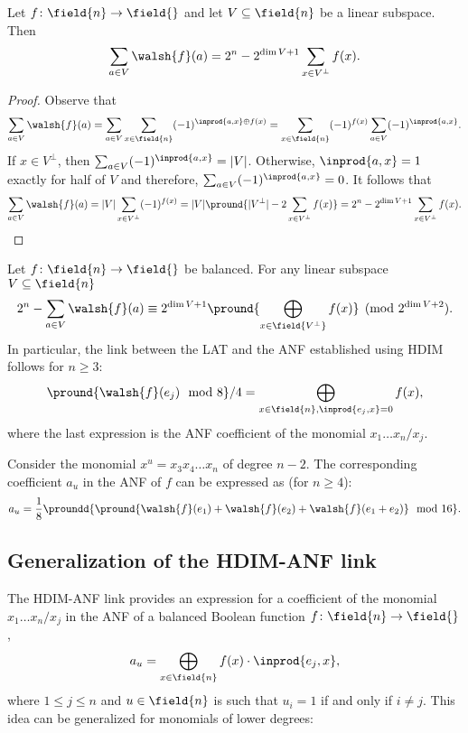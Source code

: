 \begin{theorem}
Let $f\colon \field{n} \to \field{}$ and let $V\subseteq \field{n}$ be a linear subspace. Then
$$
\sum_{a \in V}\walsh{f}(a) = 2^n-2^{\dim{V}+1}\sum_{x \in V^{\bot}}f(x).
$$
\end{theorem}
\begin{proof}
Observe that
$$
\sum_{a \in V}\walsh{f}(a) =
\sum_{a \in V}\sum_{x \in \field{n}}(-1)^{\inprod{a,x}\oplus f(x)} =
\sum_{x \in \field{n}}(-1)^{f(x)} \sum_{a \in V} (-1)^{\inprod{a,x}}.
$$
If $x \in V^{\bot}$, then $\sum_{a\in V}(-1)^{\inprod{a,x}}=|V|$. Otherwise, $\inprod{a,x}=1$ exactly for half of $V$ and therefore, $\sum_{a\in V}(-1)^{\inprod{a,x}}=0$. It follows that
$$
\sum_{a \in V}\walsh{f}(a) =
|V|\sum_{x \in V^{\bot}}(-1)^{f(x)} = 
|V|\pround{|V^{\bot}|-2\sum_{x \in V^{\bot}}f(x)} = 
2^n-2^{\dim{V}+1}\sum_{x \in V^{\bot}}f(x).
$$
\end{proof}

\begin{corollary}
Let $f\colon \field{n} \to \field{}$ be balanced. For any linear subspace $V \subseteq \field{n}$
$$
2^n - \sum_{a \in V}\walsh{f}(a)
\equiv
2^{\dim{V}+1} \pround{\bigoplus_{x\in \field{V^{\bot}}} f(x)} \pmod{{2^{\dim{V}+2}}}.
$$
In particular, the link between the LAT and the ANF established using HDIM follows for $n\ge 3$:
$$
\pround{\walsh{f}(e_j) \mod{8}}/4 = \bigoplus_{x \in \field{n},\inprod{e_j,x}=0} f(x),
$$
where the last expression is the ANF coefficient of the monomial $x_1\ldots x_n/x_j$.
\end{corollary}

\begin{example}
Consider the monomial $x^u = x_3x_4\ldots x_{n}$ of degree $n-2$. The corresponding coefficient $a_u$ in the ANF of $f$ can be expressed as (for $n \ge 4$):
$$
a_u = \frac{1}{8}\proundd{\pround{
\walsh{f}(e_{1})+\walsh{f}(e_{2})+\walsh{f}(e_{1}+e_{2})
} \mod{16}}.
$$
\end{example}



\subsection{Generalization of the HDIM-ANF link}

The HDIM-ANF link provides an expression for a coefficient of the monomial $x_1\ldots x_n/x_j$ in the ANF of a balanced Boolean function $f\colon \field{n} \to \field{}$,
$$
a_u = \bigoplus_{x \in \field{n}} f(x) \cdot \inprod{e_j, x},
$$
where $1 \le j \le n$ and $u \in \field{n}$ is such that $u_i = 1$ if and only if $i \ne j$. This idea can be generalized for monomials of lower degrees:

